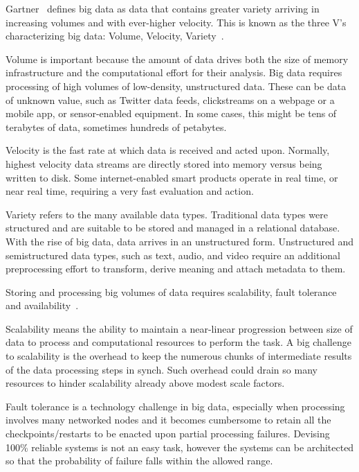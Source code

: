 Gartner~\cite{Gartner} defines big data as data that contains greater variety arriving in increasing volumes and with ever-higher velocity. This is known as the three V's characterizing  big data: Volume, Velocity, Variety~\cite{WhatIsBigData}. 

Volume is important because the amount of data drives both the size of memory infrastructure  and the computational effort for their analysis. Big data requires processing of high volumes of low-density, unstructured data. These can be data of unknown value, such as Twitter data feeds, clickstreams on a webpage or a mobile app, or sensor-enabled equipment. In some cases, this might be tens of terabytes of data, sometimes hundreds of petabytes. 

Velocity is the fast rate at which data is received and acted upon. Normally, highest velocity data streams are directly stored into memory versus being written to disk. Some internet-enabled smart products operate in real time, or near real time, requiring a very fast evaluation and action. 

Variety refers to the many available data types. Traditional data types were structured and are suitable to be stored and managed in a relational database. With the rise of big data, data arrives in an unstructured form. Unstructured and semistructured data types, such as text, audio, and video require an additional preprocessing effort to transform, derive meaning and attach metadata to them. 

Storing and processing big volumes of data requires scalability, fault tolerance and availability~\cite{articleBigData:2017}. 

Scalability means the ability to maintain a near-linear progression between size of data to process and computational resources to perform the task. A big challenge to scalability is the overhead to keep the numerous chunks of intermediate results of the data processing steps in synch. Such overhead could drain so many resources to hinder scalability already above modest scale factors.

Fault tolerance is a technology challenge in big data, especially when processing involves many networked nodes and it becomes cumbersome to retain all the checkpoints/restarts to be  enacted upon partial processing failures. Devising 100\% reliable systems is not an easy task, however the systems can be architected so that the probability of failure falls within the allowed range. 

